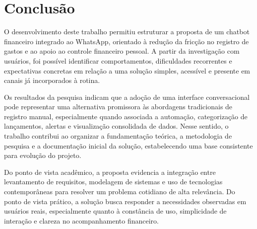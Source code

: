 \chapter{Conclusão}

O desenvolvimento deste trabalho permitiu estruturar a proposta de um chatbot financeiro integrado ao WhatsApp, orientado à redução da fricção no registro de gastos e ao apoio ao controle financeiro pessoal. A partir da investigação com usuários, foi possível identificar comportamentos, dificuldades recorrentes e expectativas concretas em relação a uma solução simples, acessível e presente em canais já incorporados à rotina.

Os resultados da pesquisa indicam que a adoção de uma interface conversacional pode representar uma alternativa promissora às abordagens tradicionais de registro manual, especialmente quando associada a automação, categorização de lançamentos, alertas e visualização consolidada de dados. Nesse sentido, o trabalho contribui ao organizar a fundamentação teórica, a metodologia de pesquisa e a documentação inicial da solução, estabelecendo uma base consistente para evolução do projeto.

Do ponto de vista acadêmico, a proposta evidencia a integração entre levantamento de requisitos, modelagem de sistemas e uso de tecnologias contemporâneas para resolver um problema cotidiano de alta relevância. Do ponto de vista prático, a solução busca responder a necessidades observadas em usuários reais, especialmente quanto à constância de uso, simplicidade de interação e clareza no acompanhamento financeiro.

